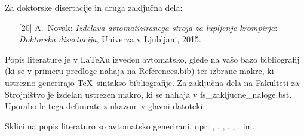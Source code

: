 Za doktorske disertacije in druga zaključna dela:
\begin{itemize}
\item[{[20]}] A.~Novak: \emph{Izdelava avtomatiziranega stroja za lupljenje krompirja}:
  \emph{Doktorska disertacija}, Univerza v Ljubljani, 2015.
\end{itemize}

Popis literature je v \LaTeX u izveden avtomatsko, glede na vašo bazo bibliografij (ki se v primeru predloge nahaja na References.bib) ter izbrane makre, ki ustrezno generirajo \TeX~sintakso bibliografije. Za zaključna dela na Fakulteti za Strojništvo je izdelan ustrezen makro, ki se nahaja v fs\_zakljucne\_naloge.bst. Uporabo le-tega definirate z ukazom \verb|| v glavni datoteki.

Sklici na popis literaturo so avtomatsko generirani, npr: \cite{bazant_1991}, \cite{Doe_1991},  \cite{Bazant_2008}, \cite{Gonzalez_2014, Bazant_2005} \cite{Bazant_2007, Kogoj_DTD, Merkur_2005, SURS_2009, SURS_2005, MKariera, Encyclopedia, Posl_app, ZGD, ZOP}, \cite{ISO_2573}, \cite{DIN_4768}, \cite{DIN_4768} in \cite{JISB0601, Novak_2015}.





